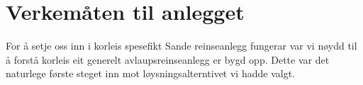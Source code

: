 \chapter{Verkemåten til anlegget}
\thispagestyle{fancy}

For å setje oss inn i korleis spesefikt Sande reinseanlegg fungerar var vi nøydd til å forstå
korleis eit generelt avlaupsreinseanlegg er bygd opp. Dette var det naturlege første
steget inn mot løysningsalterntivet vi hadde valgt. 



